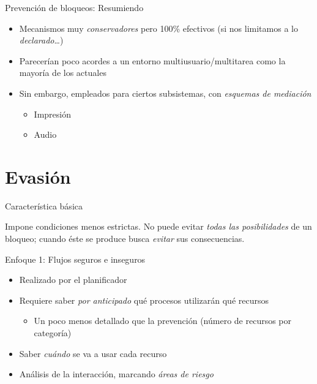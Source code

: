 \documentclass[presentation]{beamer}
\begin{document}
\begin{frame}[label={sec:org3601a04}]{Prevención de bloqueos: Resumiendo}
\begin{itemize}
\item Mecanismos muy \emph{conservadores} pero 100\% efectivos (si nos limitamos
a lo \emph{declarado}\ldots{})
\item Parecerían poco acordes a un entorno multiusuario/multitarea como la
mayoría de los actuales
\item Sin embargo, empleados para ciertos subsistemas, con \emph{esquemas de mediación}
\begin{itemize}
\item Impresión
\item Audio
\end{itemize}
\end{itemize}
\end{frame}

\section{Evasión}
\label{sec:orgb39d1c7}

\begin{frame}[label={sec:org3604259}]{Característica básica}
\begin{center}
Impone condiciones menos estrictas. No puede evitar \emph{todas las
posibilidades} de un bloqueo; cuando éste se produce busca \emph{evitar}
sus consecuencias.
\end{center}
\end{frame}

\begin{frame}[label={sec:orgbc28042}]{Enfoque 1: Flujos seguros e inseguros}
\begin{itemize}
\item Realizado por el planificador
\item Requiere saber \emph{por anticipado} qué procesos utilizarán qué recursos
\begin{itemize}
\item Un poco menos detallado que la prevención (número de recursos por
categoría)
\end{itemize}
\item Saber \emph{cuándo} se va a usar cada recurso
\item Análisis de la interacción, marcando \emph{áreas de riesgo}
\end{itemize}
\end{frame}
\end{document}
